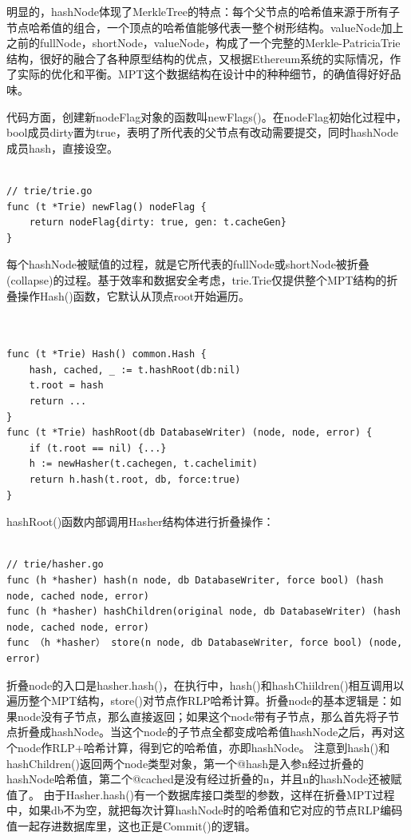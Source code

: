 \documentclass[UTF8]{ctexart}
\begin{document}
明显的，hashNode体现了MerkleTree的特点：每个父节点的哈希值来源于所有子节点哈希值的组合，一个顶点的哈希值能够代表一整个树形结构。valueNode加上之前的fullNode，shortNode，valueNode，构成了一个完整的Merkle-PatriciaTrie结构，很好的融合了各种原型结构的优点，又根据Ethereum系统的实际情况，作了实际的优化和平衡。MPT这个数据结构在设计中的种种细节，的确值得好好品味。


代码方面，创建新nodeFlag对象的函数叫newFlags()。在nodeFlag初始化过程中，bool成员dirty置为true，表明了所代表的父节点有改动需要提交，同时hashNode成员hash，直接设空。

\begin{lstlisting}

// trie/trie.go
func (t *Trie) newFlag() nodeFlag {
    return nodeFlag{dirty: true, gen: t.cacheGen}
}

\end{lstlisting}


每个hashNode被赋值的过程，就是它所代表的fullNode或shortNode被折叠(collapse)的过程。基于效率和数据安全考虑，trie.Trie仅提供整个MPT结构的折叠操作Hash()函数，它默认从顶点root开始遍历。

\begin{lstlisting}


func (t *Trie) Hash() common.Hash {
    hash, cached, _ := t.hashRoot(db:nil)
    t.root = hash
    return ...
}
func (t *Trie) hashRoot(db DatabaseWriter) (node, node, error) {
    if (t.root == nil) {...}
    h := newHasher(t.cachegen, t.cachelimit)
    return h.hash(t.root, db, force:true)
}

\end{lstlisting}

hashRoot()函数内部调用Hasher结构体进行折叠操作：

\begin{lstlisting}

// trie/hasher.go
func (h *hasher) hash(n node, db DatabaseWriter, force bool) (hash node, cached node, error)
func (h *hasher) hashChildren(original node, db DatabaseWriter) (hash node, cached node, error)
func （h *hasher） store(n node, db DatabaseWriter, force bool) (node, error)

\end{lstlisting}

折叠node的入口是hasher.hash()，在执行中，hash()和hashChiildren()相互调用以遍历整个MPT结构，store()对节点作RLP哈希计算。折叠node的基本逻辑是：如果node没有子节点，那么直接返回；如果这个node带有子节点，那么首先将子节点折叠成hashNode。当这个node的子节点全都变成哈希值hashNode之后，再对这个node作RLP+哈希计算，得到它的哈希值，亦即hashNode。
注意到hash()和hashChildren()返回两个node类型对象，第一个@hash是入参n经过折叠的hashNode哈希值，第二个@cached是没有经过折叠的n，并且n的hashNode还被赋值了。
由于Hasher.hash()有一个数据库接口类型的参数，这样在折叠MPT过程中，如果db不为空，就把每次计算hashNode时的哈希值和它对应的节点RLP编码值一起存进数据库里，这也正是Commit()的逻辑。
\end{document}

